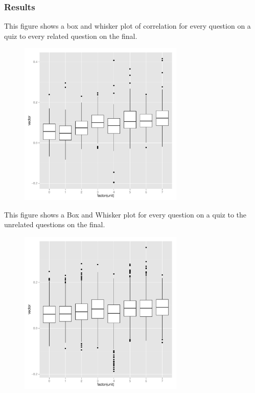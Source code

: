 \documentclass[12pt,a4paper]{article}
\begin{document}
\begin{singlespace}
\subsubsection{Results}
This figure shows a box and whisker plot of correlation for every question on a quiz to every related question on the final.
\begin{figure}[h!]
    \centering
    \includegraphics[width=0.7\textwidth,trim= 0 0 20 30, clip]{quizcorrelationbox.pdf}
\end{figure}

\newpage

This figure shows a Box and Whisker plot for every question on a quiz to the unrelated questions on the final.
\begin{figure}[h!]
    \centering
    \includegraphics[width=0.7\textwidth,trim= 0 0 20 30, clip]{unrelatedcorrelationbox.pdf}
\end{figure}
\FloatBarrier


\end{singlespace}
\end{document}
